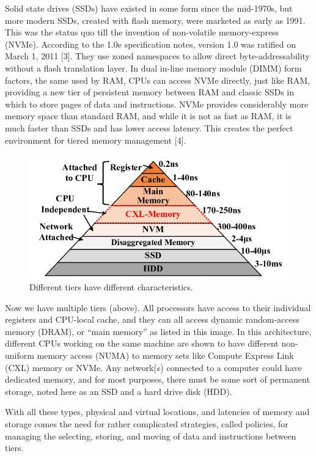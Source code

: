 \documentclass[conference]{IEEEtran}
\begin{document}
Solid state drives (SSDs) have existed in some form since the mid-1970s, but more modern SSDs, created with flash memory, were marketed as early as 1991.  This was the status quo till the invention of non-volatile memory-express (NVMe).  According to the 1.0e specification notes, version 1.0 was ratified on March 1, 2011 [3].  They use zoned namespaces to allow direct byte-addressability without a flash translation layer.  In dual in-line memory module (DIMM) form factors, the same used by RAM, CPUs can access NVMe directly, just like RAM, providing a new tier of persistent memory between RAM and classic SSDs in which to store pages of data and instructions.  NVMe provides considerably more memory space than standard RAM, and while it is not as fast as RAM, it is much faster than SSDs and has lower access latency.  This creates the perfect environment for tiered memory management [4]. 

\begin{figure}
    \centering
    \includegraphics[scale=1.1]{tiering.png}
    \caption{Different tiers have different characteristics.}
\end{figure}

Now we have multiple tiers (above).  All processors have access to their individual registers and CPU-local cache, and they can all access dynamic random-access memory (DRAM), or “main memory” as listed in this image.  In this architecture, different CPUs working on the same machine are shown to have different non-uniform memory access (NUMA) to memory sets like Compute Express Link (CXL) memory or NVMe.  Any network(s) connected to a computer could have dedicated memory, and for most purposes, there must be some sort of permanent storage, noted here as an SSD and a hard drive disk (HDD). 

With all these types, physical and virtual locations, and latencies of memory and storage comes the need for rather complicated strategies, called policies, for managing the selecting, storing, and moving of data and instructions between tiers. 
\end{document}

